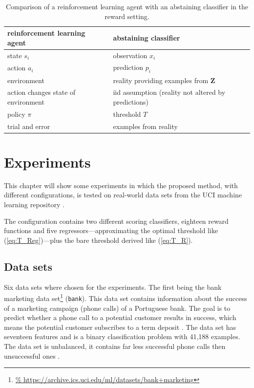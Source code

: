 \documentclass[twoside,11pt]{article}
\def\Z{\textbf{Z}}
\begin{document}
\begin{table}
  \begin{center}
  \begin{tabu}{l|X}
    reinforcement learning agent &abstaining classifier \\
    \hline
    state $s_i$ &observation $x_i$ \\
    action $a_i$ &prediction $p_i$ \\
    environment &reality providing examples from $\Z$ \\
    action changes state of environment
    &iid assumption (reality not altered by predictions)\\
    policy $\pi$ &threshold $T$ \\
    trial and error &examples from reality
  \end{tabu}
  \end{center}
  \caption{Comparison of a reinforcement learning agent
            with an abstaining classifier in the reward
            setting.}
  \label{tab:rl_vs_ac}
\end{table}


\section{Experiments}
\label{sec:experiments}

This chapter will show some experiments in which the
proposed method, with different configurations, is tested
on real-world data sets from the UCI machine learning
repository \citep[see][]{uci}.

The configuration contains two different scoring
classifiers, eighteen reward functions and five
regressors---approximating the optimal threshold like
(\ref{eq:T_Reg})---plus the bare threshold derived like
(\ref{eq:T_R}).

\subsection{Data sets}

Six data sets where chosen for the experiments. The first
being the bank marketing data set\footnote{\url{%
  https://archive.ics.uci.edu/ml/datasets/bank+marketing}}
(\texttt{bank}).
This data set contains information about the success of
a marketing campaign (phone calls) of a Portuguese bank.
The goal is to predict whether a phone call to a potential
customer results in success, which means the potential
customer subscribes to a term deposit
\citep[see][]{moro_et_al_2014}.
The data set has seventeen features and is a binary
classification problem with 41,188 examples.
The data set is unbalanced, it contains far less successful
phone calls then unsuccessful ones
\citep[see][]{moro_et_al_2014}.
\end{document}
